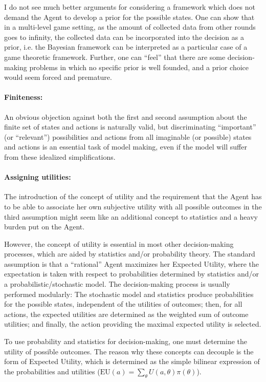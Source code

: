 \documentclass{article}
\begin{document}
I do not see much better arguments for considering a framework which does not demand the Agent to develop a prior for the possible states. One can show that in a multi-level game setting, as the amount of collected data from other rounds goes to infinity, the collected data can be incorporated into the decision as a prior, i.e. the Bayesian framework can be interpreted as a particular case of a game theoretic framework. Further, one can ``feel'' that there are some decision-making problems in which no specific prior is well founded, and a prior choice would seem forced and premature.

\paragraph{Finiteness:}
An obvious objection against both the first and second assumption about the finite set of states and actions is naturally valid, but discriminating ``important'' (or ``relevant'') possibilities and actions from all imaginable (or possible) states and actions is an essential task of model making, even if the model will suffer from these idealized simplifications.

\paragraph{Assigning utilities:}
The introduction of the concept of utility and the requirement that the Agent has to be able to associate her own subjective utility with all possible outcomes in the third assumption might seem like an additional concept to statistics and a heavy burden put on the Agent.

However, the concept of utility is essential in most other decision-making processes, which are aided by statistics and/or probability theory. The standard assumption is that a ``rational'' Agent maximizes her Expected Utility, where the expectation is taken with respect to probabilities determined by statistics and/or a probabilistic/stochastic model. The decision-making process is usually performed modularly: The stochastic model and statistics produce probabilities for the possible states, independent of the utilities of outcomes; then, for all actions, the expected utilities are determined as the weighted sum of outcome utilities; and finally, the action providing the maximal expected utility is selected.

To use probability and statistics for decision-making, one must determine the utility of possible outcomes. The reason why these concepts can decouple is the form of Expected Utility, which is determined as the simple bilinear expression of the probabilities and utilities ($\mathrm{EU}(a)=\sum_\theta U(a,\theta) \pi(\theta)$).
\end{document}
